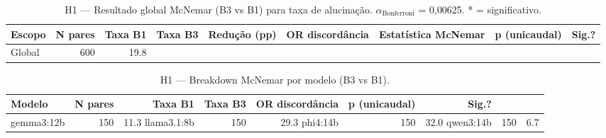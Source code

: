 \begin{table}[htbp]
\centering
\caption{H1 — Resultado global McNemar (B3 vs B1) para taxa de alucinação. $\alpha_\text{Bonferroni}$ = 0{,}00625. * = significativo.}
\label{tab:t4_h1_global}
\small
\begin{tabular}{lrrrrrrr}
\toprule
Escopo & N pares & Taxa B1 & Taxa B3 & Redução (pp) & OR discordância & Estatística McNemar & p (unicaudal) & Sig.? \\
\midrule
Global & 600 & 19.8%
\bottomrule
\end{tabular}
\end{table}

\begin{table}[htbp]
\centering
\caption{H1 — Breakdown McNemar por modelo (B3 vs B1).}
\label{tab:t4_h1_modelo}
\small
\begin{tabular}{lrrrrrr}
\toprule
Modelo & N pares & Taxa B1 & Taxa B3 & OR discordância & p (unicaudal) & Sig.? \\
\midrule
gemma3:12b & 150 & 11.3%
llama3.1:8b & 150 & 29.3%
phi4:14b & 150 & 32.0%
qwen3:14b & 150 & 6.7%
\bottomrule
\end{tabular}
\end{table}
